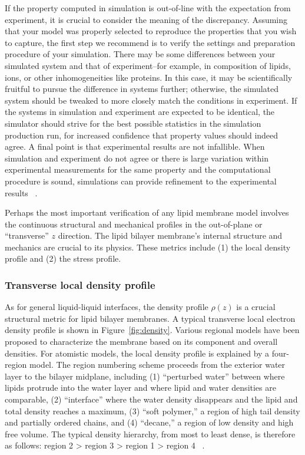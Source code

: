 \documentclass[9pt,bestpractices,pubversion]{livecoms}
\begin{document}
If the property computed in simulation is out-of-line with the expectation from experiment, it is crucial to consider the meaning of the discrepancy.
Assuming that your model was properly selected to reproduce the properties that you wish to capture, the first step we recommend is to verify the settings and preparation procedure of your simulation.
There may be some differences between your simulated system and that of experiment--for example, in composition of lipids, ions, or other inhomogeneities like proteins.
In this case, it may be scientifically fruitful to pursue the difference in systems further; otherwise, the simulated system should be tweaked to more closely match the conditions in experiment.
If the systems in simulation and experiment are expected to be identical, the simulator should strive for the best possible statistics in the simulation production run, for increased confidence that property values should indeed agree.
A final point is that experimental results are not infallible.
When simulation and experiment do not agree or there is large variation within experimental measurements for the same property and the computational procedure is sound, simulations can provide refinement to the experimental results ~\cite{Venable2015}.

Perhaps the most important verification of any lipid membrane model involves the continuous structural and mechanical profiles in the out-of-plane or ``transverse'' $z$ direction. The lipid bilayer membrane's internal structure and mechanics are crucial to its physics. These metrics include (1) the local density profile and (2) the stress profile.

\subsubsection{Transverse local density profile}
\label{subsubsec:locdens}
As for general liquid-liquid interfaces, the density profile $\rho(z)$ is a crucial structural metric for lipid bilayer membranes.
A typical transverse local electron density profile is shown in Figure~\ref{fig:density}.
Various regional models have been proposed to characterize the membrane based on its component and overall densities.
For atomistic models, the local density profile is explained by a four-region model.
The region numbering scheme proceeds from the exterior water layer to the bilayer midplane, including (1) ``perturbed water'' between where lipids protrude into the water layer and where lipid and water densities are comparable, (2) ``interface'' where the water density disappears and the lipid and total density reaches a maximum, (3) ``soft polymer,'' a region of high tail density and partially ordered chains, and (4) ``decane,'' a region of low density and high free volume.
The typical density hierarchy, from most to least dense, is therefore as follows: region 2 > region 3 > region 1 > region 4 ~\cite{Tieleman1997b,Marrink1994}.
\end{document}
